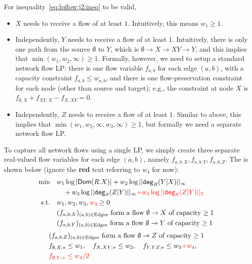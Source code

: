 \begin{example}
For inequality~\eqref{eq:lpflow:j2:ineq} to be valid,
\begin{itemize}
    \item $X$ needs to receive a flow of at least $1$.  Intuitively,
      this means $w_1 \geq 1$.  
    \item Independently, $Y$ needs to receive a flow of at least
      $1$. Intuitively, there is only one path from the source
      $\emptyset$ to $Y$, which is $\emptyset \to X \to XY \to Y$, and
      this implies that $\min(w_1, w_2, \infty) \geq 1$.  Formally,
      however, we need to setup a standard network flow LP: there is
      one flow variable  $f_{a,b}$ for each edge $(a,b)$, with a
      capacity constraint $f_{a,b} \leq w_{a,b}$, and there is one
      flow-preservation constraint for each node (other than source
      and target); e.g., the constraint at node $X$ is
      $f_{\emptyset,X}+f_{XY,X}-f_{X,XY}=0$.
    \item Independently, $Z$ needs to receive a flow of at least
      $1$. Similar to above, this implies that
      $\min(w_1, w_2, \infty, w_3, \infty) \geq 1$, but formally we
      need a separate network flow LP.
\end{itemize}
%
To capture all network flows using a single LP, we simply create three
separate real-valued flow variables for each edge $(a, b)$, namely
$f_{a,b; X}, f_{a,b; Y}, f_{a,b; Z}$.  The \lpflow is shown below 
(ignore the {\bf\color{red} red} text referring to {\color{red}$w_4$} for now): 
  \begin{align}
    \min\quad
        &w_1 \log |\textsf{Dom}(R.X)|+
        w_2 \log ||\texttt{deg}_R(Y|X)||_\infty\label{eq:lpflow:j2:lp:revised}\\
        &\quad +w_3 \log ||\texttt{deg}_S(Z|Y)||_\infty
        {\color{red}+w_4 \log ||\texttt{deg}_S(Z|Y)||_2}\nonumber\\
    \text{s.t.}\quad&w_1, w_2, w_3, {\color{red}{w_4}} \geq 0\nonumber\\
      & (f_{a,b;X})_{(a,b) \in \text{Edges}} \text{ form a flow $\emptyset\rightarrow X$ of capacity $\geq 1$}\nonumber\\
      & (f_{a,b;Y})_{(a,b) \in \text{Edges}} \text{ form a flow $\emptyset\rightarrow Y$ of capacity $\geq 1$}\nonumber\\
  \end{align}
  \begin{align}
        & (f_{a,b;Z})_{(a,b) \in \text{Edges}} \text{ form a flow $\emptyset\rightarrow Z$ of capacity $\geq 1$}\nonumber\\
        & f_{\emptyset,X;*}\leq w_1,\quad
        f_{X,XY;*}\leq w_2,\quad
        f_{Y,YZ;*}\leq w_3 {\color{red}+ w_4},\nonumber\\
        &{\color{red}f_{\emptyset,Y;*}\leq w_4/2}\nonumber
  \end{align}


\end{example}
